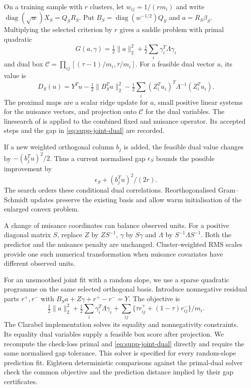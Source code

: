 On a training sample with $r$ clusters, let
$w_{ij}=1/(r m_i)$ and write
$\operatorname{diag}(\sqrt w)X_S=Q_SR_S$. Put
$B_S=\operatorname{diag}(w^{-1/2})Q_S$ and $a=R_S\beta_S$.
Multiplying the selected criterion by $r$ gives a saddle problem
with primal quadratic
\[
 G(a,\gamma)=\tfrac12\|a\|_2^2
                       +\tfrac12\sum_i\gamma_i^T\Lambda\gamma_i
\]
and dual box
$\mathcal C=\prod_{ij}[(\tau-1)/m_i,\tau/m_i]$.
For a feasible dual vector $u$, its value is
\begin{equation}\label{eq:supp-joint-dual}
 D_S(u)=Y^Tu-\tfrac12\|B_S^Tu\|_2^2
       -\tfrac12\sum_i(Z_i^Tu_i)^T\Lambda^{-1}(Z_i^Tu_i).
\end{equation}
The proximal maps are a scalar ridge update for $a$, small positive
linear systems for the nuisance vectors, and projection onto
$\mathcal C$ for the dual variables. The linesearch of
 is applied to the combined fixed and nuisance
operator. Its accepted steps and the gap in
\eqref{eq:supp-joint-dual} are recorded.

If a new weighted orthogonal column $b_j$ is added, the feasible dual
value changes by $-(b_j^Tu)^2/2$. Thus a current normalised gap
$\epsilon_S$ bounds the possible improvement by
\[
 \epsilon_S+(b_j^Tu)^2/(2r).
\]
The search orders these conditional dual correlations. Reorthogonalised
Gram--Schmidt updates preserve the existing basis and allow warm
initialisation of the enlarged convex problem.

A change of nuisance coordinates can balance observed units.
For a positive diagonal matrix $S$, replace $Z$ by $ZS^{-1}$,
$\gamma$ by $S\gamma$ and $\Lambda$ by $S^{-1}\Lambda S^{-1}$.
Both the predictor and the nuisance penalty are unchanged.
Cluster-weighted RMS scales provide one such numerical transformation
when nuisance covariates have different observed units.

For an unsmoothed joint fit with a random slope, we use a sparse
quadratic programme on the same selected orthogonal basis. Introduce
nonnegative residual parts $r^+,r^-$ with
$B_Sa+Z\gamma+r^+-r^-=Y$. The objective is
\[
 \tfrac12\|a\|_2^2+\tfrac12\sum_i\gamma_i^T\Lambda\gamma_i
       +\sum_{ij}\{\tau r_{ij}^++(1-\tau)r_{ij}^-\}/m_i.
\]
The Clarabel implementation \cite{goulart2026} solves its equality and nonnegativity
constraints. Its equality dual variables supply a feasible box
score after projection. We recompute the check-loss primal and
\eqref{eq:supp-joint-dual} directly and require the same normalised
gap tolerance. This solver is specified for every random-slope
prediction fit. Eighteen deterministic comparisons against the
primal-dual solver check the common objective and the prediction
distance implied by their gap certificates.

